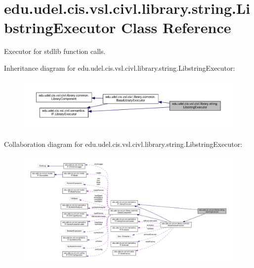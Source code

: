 \hypertarget{classedu_1_1udel_1_1cis_1_1vsl_1_1civl_1_1library_1_1string_1_1LibstringExecutor}{}\section{edu.\+udel.\+cis.\+vsl.\+civl.\+library.\+string.\+Libstring\+Executor Class Reference}
\label{classedu_1_1udel_1_1cis_1_1vsl_1_1civl_1_1library_1_1string_1_1LibstringExecutor}


Executor for stdlib function calls.  




Inheritance diagram for edu.\+udel.\+cis.\+vsl.\+civl.\+library.\+string.\+Libstring\+Executor\+:
\nopagebreak
\begin{figure}[H]
\begin{center}
\leavevmode
\includegraphics[width=350pt]{classedu_1_1udel_1_1cis_1_1vsl_1_1civl_1_1library_1_1string_1_1LibstringExecutor__inherit__graph}
\end{center}
\end{figure}


Collaboration diagram for edu.\+udel.\+cis.\+vsl.\+civl.\+library.\+string.\+Libstring\+Executor\+:
\nopagebreak
\begin{figure}[H]
\begin{center}
\leavevmode
\includegraphics[width=350pt]{classedu_1_1udel_1_1cis_1_1vsl_1_1civl_1_1library_1_1string_1_1LibstringExecutor__coll__graph}
\end{center}
\end{figure}
